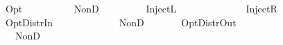\ \ {\isacharbar}\ {\isachardoublequoteopen}\ {\isacharparenleft}Opt\ \ \ \ {\isacharequal}\isanewline
\ \ \ \ \ \ NonD\ \ {\isacharparenleft}\ \ {\isacharparenleft}\ \isanewline
\ \ {\isacharbar}\ {\isachardoublequoteopen}\ {\isacharparenleft}InjectL\ \ \ {\isacharequal}\isanewline
\ \ \ \ \ \ \isanewline
\ \ {\isacharbar}\ {\isachardoublequoteopen}\ {\isacharparenleft}InjectR\ \ \ {\isacharequal}\isanewline
\ \ \ \ \ \ \isanewline
\ \ {\isacharbar}\ {\isachardoublequoteopen}\ {\isacharparenleft}OptDistrIn\ \ \ \ \ {\isacharequal}\isanewline
\ \ \ \ \ \ \ {\isasymodot}\ {\isacharparenleft}NonD\ \ \ \isanewline
\ \ {\isacharbar}\ {\isachardoublequoteopen}\ {\isacharparenleft}OptDistrOut\ \ \ \ \ {\isacharequal}\isanewline
\ \ \ \ \ \ NonD\ \ {\isacharparenleft}\ {\isasymodot}\ \ {\isacharparenleft}\ {\isasymodot}\ 
